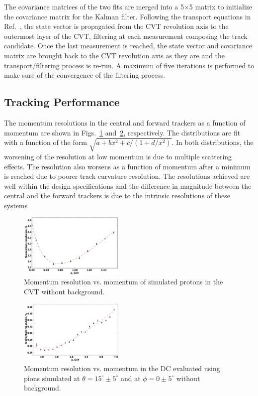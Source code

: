 The covariance matrices of the two fits are merged into a 5$\times$5 matrix to initialize the covariance matrix
for the Kalman filter. Following the transport equations in Ref.~\cite{ILC-Tracking}, the state vector is
propagated from the CVT revolution axis to the outermost layer of the CVT, filtering at each measurement
composing the track candidate. Once the last measurement is reached, the state vector and covariance matrix
are brought back to the CVT revolution axis as they are and the transport/filtering process is re-run. A maximum
of five iterations is performed to make sure of the convergence of the filtering process.

\subsection{Tracking Performance}

The momentum resolutions in the central and forward trackers as a function of momentum are shown in
Figs.~\ref{fig:respcvt} and~\ref{fig:respdc}, respectively. The distributions are fit with a function of the form
$\sqrt{a+b x^2+c/(1+d/x^2)}$.  In both distributions, the worsening of the resolution at low momentum is due to
multiple scattering effects. The resolution also worsens as a function of momentum after a minimum is reached due
to poorer track curvature resolution.  The resolutions achieved are well within the design specifications and the
difference in magnitude between the central and the forward trackers is due to the intrinsic resolutions of these
systems

\begin{figure}
\includegraphics[width=0.45\textwidth]{pics/fddegipekmpjjiho.png}
\caption{Momentum resolution vs. momentum of simulated protons in the CVT without background.}
\label{fig:respcvt}
\end{figure}

\begin{figure}
\includegraphics[width=0.45\textwidth]{pics/DCRes.png}
\caption{Momentum resolution vs. momentum in the DC evaluated using pions simulated at
  $\theta =15^\circ \pm 5^\circ$ and at $\phi = 0 \pm 5^\circ$ without background.}
\label{fig:respdc}
\end{figure}

